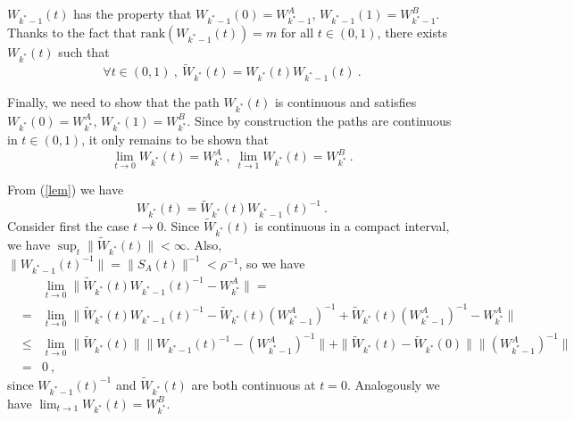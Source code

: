 $W_{k^*-1}(t)$ has the property that $W_{k^*-1}(0) = W_{k^*-1}^A$, $W_{k^*-1}(1) = W_{k^*-1}^B$.  
Thanks to the fact that $\text{rank}(W_{k^*-1}(t)) = m$ for all $t \in (0,1)$, there exists $W_{k^*}(t)$ such that
\begin{equation}
\label{lem}
\forall t \in (0,1)~,~ \tilde{W}_{k^*}(t) = W_{k^*}(t) W_{k^*-1}(t)~.
\end{equation}
%

Finally, we need to show that the path $W_{k^*}(t)$ is continuous 
and satisfies $W_{k^*}(0) = W_{k^*}^A$, $W_{k^*}(1) = W_{k^*}^B$.
Since by construction the paths are continuous in $t \in (0,1)$, it only remains to be shown that
\begin{equation}
\lim_{t\to 0} W_{k^*}(t) = W_{k^*}^A~,~\lim_{t\to 1} W_{k^*}(t) = W_{k^*}^B~.
\end{equation}

From (\ref{lem}) we have 
$$W_{k^*}(t) = \tilde{W}_{k^*}(t) W_{k^*-1}(t)^{-1} ~. $$
Consider first the case $t \to 0$.
Since $\tilde{W}_{k^*}(t)$ is continuous in a compact interval,  
we have $\sup_t \|\tilde{W}_{k^*}(t) \| < \infty$. Also, $\|W_{k^*-1}(t)^{-1}\| = \| S_A(t) \|^{-1} < \rho^{-1} $, 
so we have 
\begin{eqnarray}
\label{kem}
&& \lim_{t \to 0} \|  \tilde{W}_{k^*}(t)  W_{k^*-1}(t)^{-1}  - W_{k^*}^A  \| =  \nonumber \\
&=& \lim_{t \to 0} \|  \tilde{W}_{k^*}(t)  W_{k^*-1}(t)^{-1}  -  \tilde{W}_{k^*}(t)  (W_{k^*-1}^A)^{-1} +  \tilde{W}_{k^*}(t)  (W_{k^*-1}^A)^{-1} -  W_{k^*}^A \| \nonumber \\
&\leq &  \lim_{t \to 0}  \|  \tilde{W}_{k^*}(t) \| \|  W_{k^*-1}(t)^{-1} - (W_{k^*-1}^A)^{-1} \| + \| \tilde{W}_{k^*}(t)  - \tilde{W}_{k^*}(0) \| \| (W_{k^*-1}^A)^{-1} \| \nonumber \\
&=& 0~,
\end{eqnarray}
since $W_{k^*-1}(t)^{-1}$  and $\tilde{W}_{k^*}(t)$ are both continuous at $t=0$.
Analogously we have 
$\lim_{t \to 1} W_{k^*}(t) = W_{k^*}^B $.

